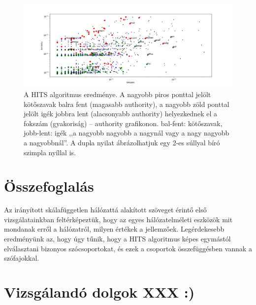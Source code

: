\documentclass{llncs}
\begin{document}
\begin{figure}[h]
\begin{center}
\includegraphics[width=18cm]{conv-verb-auth.png}
\end{center}
\caption{A HITS algoritmus eredménye.
A nagyobb piros ponttal jelölt kötőszavak balra fent
(magasabb authority),
a nagyobb zöld ponttal jelölt igék jobbra lent
(alacsonyabb authority)
helyezkednek el
a fokszám (gyakoriság) -- authority grafikonon.
bal-fent: kötőszavak, jobb-lent: igék
,,a nagyobb nagyobb a nagynál vagy a nagy nagyobb a nagyobbnál''.
A dupla nyilat ábrázolhatjuk egy 2-es súllyal bíró szimpla nyíllal is.
\label{fig:hits-auth}}
\end{figure}


\section{Összefoglalás}

Az irányított skálafüggetlen hálózattá alakított szöveget
érintő első vizsgálatainkban feltérképeztük,
hogy az egyes hálózatelméleti eszközök
mit mondanak erről a hálózatról, milyen értékek a jellemzőek.
%
Legérdekesebb eredményünk az,
hogy úgy tűnik, hogy a HITS algoritmus
képes egymástól elválasztani bizonyos szócsoportokat,
és ezek a csoportok összefüggésben vannak a szófajokkal.


\newpage %

\section{Vizsgálandó dolgok XXX :)}
\end{document}
